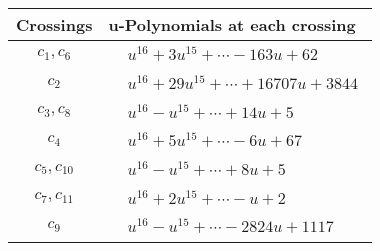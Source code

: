 \documentclass[1p]{elsarticle_modified}
\theoremstyle{definition}
\begin{document}
\begin{tabular}{m{50pt}|m{274pt}}
Crossings & \hspace{64pt}u-Polynomials at each crossing \\
\hline $$\begin{aligned}c_{1},c_{6}\end{aligned}$$&$\begin{aligned}
&u^{16}+3 u^{15}+\cdots-163 u+62
\end{aligned}$\\
\hline $$\begin{aligned}c_{2}\end{aligned}$$&$\begin{aligned}
&u^{16}+29 u^{15}+\cdots+16707 u+3844
\end{aligned}$\\
\hline $$\begin{aligned}c_{3},c_{8}\end{aligned}$$&$\begin{aligned}
&u^{16}- u^{15}+\cdots+14 u+5
\end{aligned}$\\
\hline $$\begin{aligned}c_{4}\end{aligned}$$&$\begin{aligned}
&u^{16}+5 u^{15}+\cdots-6 u+67
\end{aligned}$\\
\hline $$\begin{aligned}c_{5},c_{10}\end{aligned}$$&$\begin{aligned}
&u^{16}- u^{15}+\cdots+8 u+5
\end{aligned}$\\
\hline $$\begin{aligned}c_{7},c_{11}\end{aligned}$$&$\begin{aligned}
&u^{16}+2 u^{15}+\cdots- u+2
\end{aligned}$\\
\hline $$\begin{aligned}c_{9}\end{aligned}$$&$\begin{aligned}
&u^{16}- u^{15}+\cdots-2824 u+1117
\end{aligned}$\\
\hline
\end{tabular}\\~\\
\newpage\renewcommand{\arraystretch}{1}
\end{document}
